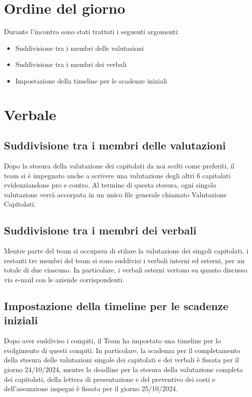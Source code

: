 \documentclass[italian, 12pt]{article}
\begin{document}
\section{Ordine del giorno}
Durante l'incontro sono stati trattati i seguenti argomenti: 
\begin{flushleft}
        \begin{itemize}
            \item Suddivisione tra i membri delle valutazioni
            \item Suddivisione tra i membri dei verbali
            \item Impostazione della timeline per le scadenze iniziali
        \end{itemize}
\end{flushleft}
\newpage

\section{Verbale}
\subsection{Suddivisione tra i membri delle valutazioni}
Dopo la stesura della valutazione dei capitolati da noi scelti come preferiti, il team si è impegnato anche a scrivere una valutazione degli altri 6 capitolati evidenziandone pro e contro. Al termine di questa stesura, ogni singola valutazione verrà accorpata in un unico file generale chiamato Valutazione Capitolati. 

\subsection{Suddivisione tra i membri dei verbali}
Mentre parte del team si occupava di stilare la valutazione dei singoli capitolati, i restanti tre membri del team si sono suddivisi i verbali interni ed esterni, per un totale di due ciascuno. In particolare, i verbali esterni vertono su quanto discusso via e-mail con le aziende corrispondenti. 

\subsection{Impostazione della timeline per le scadenze iniziali}
Dopo aver suddiviso i compiti, il Team ha impostato una timeline per lo svolgimento di questi compiti. In particolare, la scadenza per il completamento della stesura delle valutazioni singole dei capitolati e dei verbali è fissata per il giorno 24/10/2024, mentre la deadline per la stesura della valutazione completa dei capitolati, della lettera di presentazione e del preventivo dei costi e dell'assunzione impegni è fissata per il giorno 25/10/2024. 
\end{document}
